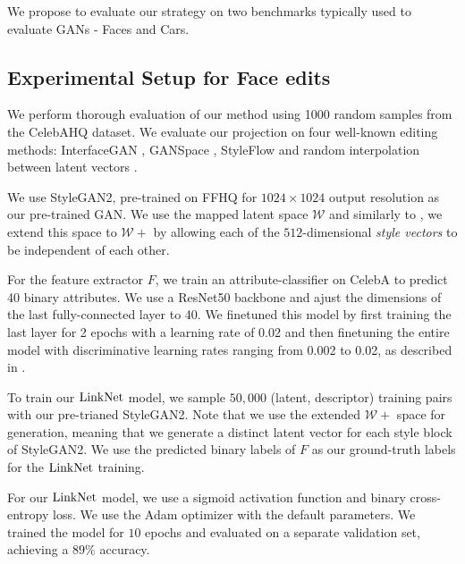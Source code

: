 We propose to evaluate our \magec strategy on two benchmarks typically 
used to evaluate \ac{GAN}s - Faces and Cars. 

\subsection{Experimental Setup for Face edits}


We perform thorough evaluation of our method using 1000 random samples from the CelebAHQ 
\citep{karras2018progressive} dataset. We evaluate our projection on four well-known editing methods: InterfaceGAN 
 \citep{shen2020}, GANSpace \citep{harkonen2020ganspace}, StyleFlow \citep{abdal2020styleflow} and random 
 interpolation between latent vectors \citep{karra2019stylegan}.

 We use StyleGAN2, pre-trained on FFHQ for $1024 \times 1024$ output resolution as our
 pre-trained GAN. We use the mapped latent space $\mathcal{W}$ and similarly to 
  \citep{abdal2019image2stylegan, abdal2020, psp, zhu2020indomain, e4e}, we extend this
   space to $\mathcal{W+}$ by allowing each of the $512$-dimensional \emph{style vectors}
    to be independent of each other. 


For the feature extractor $F$, we train an attribute-classifier
on CelebA \citep{celeba} to predict 40 binary attributes. We use a 
ResNet50 backbone \citep{he2016resnet}
and ajust the dimensions of the last fully-connected layer to 40. We finetuned 
this model by first 
training the last layer for 2 epochs with a learning rate of 0.02 and then 
finetuning 
the entire model with discriminative learning rates ranging from 0.002 to
 0.02, as described 
in \cite{howard2018universal}.
    
To train our $\mathrm{LinkNet}$ model,
we sample $50,000$ (latent, descriptor) training pairs with our pre-trianed StyleGAN2. 
Note that we use the extended $\mathcal{W+}$ space for generation, meaning 
that we generate a distinct latent vector for each style block of StyleGAN2. 
We use the predicted binary labels of $F$ as our ground-truth labels for the 
$\mathrm{LinkNet}$ training.
    
For our $\mathrm{LinkNet}$ model, we use a sigmoid activation function and 
binary cross-entropy 
loss. We use 
the Adam \citep{adam} optimizer with the default parameters. We 
trained the model for $10$ epochs and evaluated on a separate validation set, 
achieving a 
$89\%$ accuracy.
    
